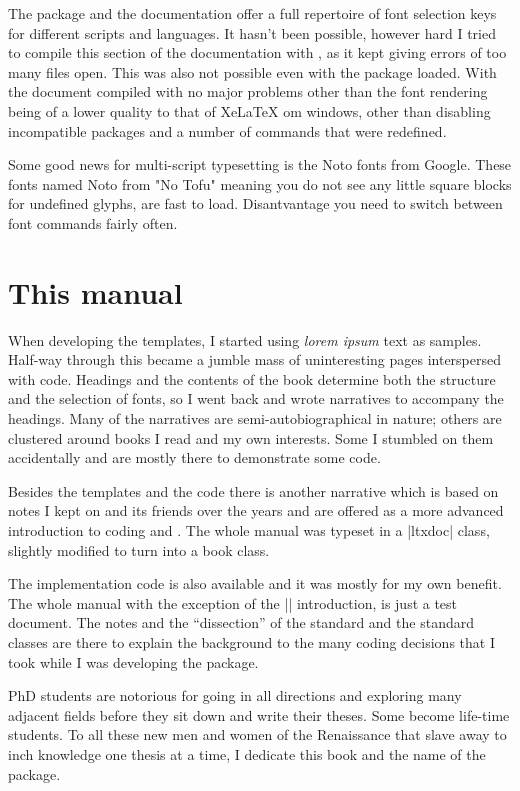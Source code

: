 The package and the documentation offer a full repertoire of font selection keys for different scripts and languages. It hasn't been possible, however hard I tried to compile this section of the documentation with \xelatex, as it kept giving errors of too many files open. This was also not possible even with the  package loaded. With \lualatex the document compiled with no major problems other than the font rendering being of a lower quality to that of XeLaTeX om windows, other than disabling incompatible packages and a number of commands that were redefined. 

Some good news for multi-script typesetting is the Noto fonts from Google. These fonts named Noto from "No Tofu" meaning you do not see any little square blocks for undefined glyphs, are fast to load. Disantvantage you need to switch between font commands fairly often.

\section{This manual}

When developing the templates, I started using \emph{lorem ipsum} text as samples. Half-way through this
became a jumble mass of uninteresting pages interspersed with code. Headings and the contents of the book
determine both the structure and the selection of fonts, so I went back and wrote narratives  to accompany
the headings. Many of the narratives are semi-autobiographical in nature; others are clustered around books I read and my own interests. Some I stumbled on them accidentally and are mostly there to demonstrate some code.

Besides the templates and the code there is another narrative which is based on notes I kept on \tex and its friends over the years and are offered as a more advanced introduction to coding \latexe and \tex. The whole manual was typeset in a |ltxdoc| class, slightly modified to turn into a book class.

The implementation code is also available and it was mostly for my own benefit. The whole manual with the exception of the |\cxset| introduction, is just a test document. The notes and the “dissection” of the standard \latexe and the standard classes are there to explain the background to the many coding decisions that I took while I was developing the package.

PhD students are notorious for going in all directions and exploring many adjacent fields before they sit down and write their theses. Some become life-time students. To all these new men and women of the Renaissance that slave away to inch knowledge one thesis at a time, I dedicate this book and the name of the package.

